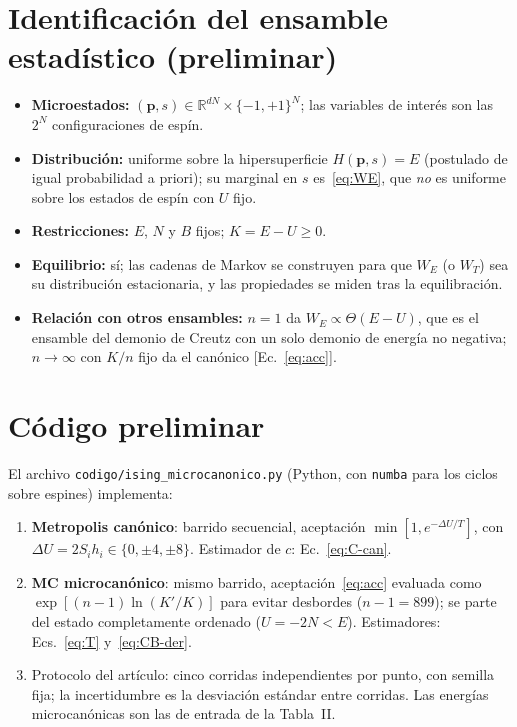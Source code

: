 \documentclass[11pt,letterpaper]{article}
\begin{document}
\section{Identificación del ensamble estadístico (preliminar)}
\begin{itemize}[leftmargin=1.2em,itemsep=1pt]
\item \textbf{Microestados:} $(\bm p,s)\in\mathbb R^{dN}\times\{-1,+1\}^N$; las
variables de interés son las $2^N$ configuraciones de espín.
\item \textbf{Distribución:} uniforme sobre la hipersuperficie $H(\bm p,s)=E$
(postulado de igual probabilidad a priori); su marginal en $s$ es~\eqref{eq:WE}, que
\emph{no} es uniforme sobre los estados de espín con $U$ fijo.
\item \textbf{Restricciones:} $E$, $N$ y $B$ fijos; $K=E-U\ge0$.
\item \textbf{Equilibrio:} sí; las cadenas de Markov se construyen para que $W_E$ (o
$W_T$) sea su distribución estacionaria, y las propiedades se miden tras la
equilibración.
\item \textbf{Relación con otros ensambles:} $n=1$ da $W_E\propto\Theta(E-U)$, que es
el ensamble del demonio de Creutz con un solo demonio de energía no negativa; $n\to\infty$
con $K/n$ fijo da el canónico [Ec.~\eqref{eq:acc}].
\end{itemize}

\section{Código preliminar}
El archivo \texttt{codigo/ising\_microcanonico.py} (Python, con \texttt{numba} para
los ciclos sobre espines) implementa:
\begin{enumerate}[itemsep=1pt]
\item \textbf{Metropolis canónico}: barrido secuencial, aceptación
$\min[1,e^{-\Delta U/T}]$, con $\Delta U=2S_ih_i\in\{0,\pm4,\pm8\}$. Estimador
de $c$: Ec.~\eqref{eq:C-can}.
\item \textbf{MC microcanónico}: mismo barrido, aceptación~\eqref{eq:acc} evaluada como
$\exp[(n-1)\ln(K'/K)]$ para evitar desbordes ($n-1=899$); se parte del estado
completamente ordenado ($U=-2N<E$). Estimadores: Ecs.~\eqref{eq:T} y~\eqref{eq:CB-der}.
\item Protocolo del artículo: cinco corridas independientes por punto, con semilla fija;
la incertidumbre es la desviación estándar entre corridas. Las energías
microcanónicas son las de entrada de la Tabla~II.
\end{enumerate}
\end{document}
